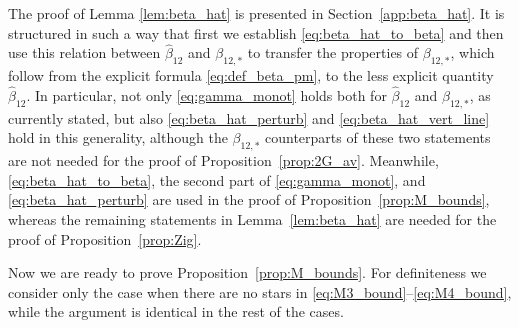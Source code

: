 \documentclass[10pt]{amsart}
\numberwithin{equation}{section}
\begin{document}
The proof of Lemma \ref{lem:beta_hat} is presented in Section~\ref{app:beta_hat}. It is structured in such a way that first we establish \eqref{eq:beta_hat_to_beta} and then use this relation between $\widehat{\beta}_{12}$ and $\beta_{12,*}$ to transfer the properties of $\beta_{12,*}$, which follow from the explicit formula \eqref{eq:def_beta_pm}, to the less explicit quantity $\widehat{\beta}_{12}$. In particular, not only \eqref{eq:gamma_monot} holds both for $\widehat{\beta}_{12}$ and $\beta_{12,*}$, as currently stated, but also \eqref{eq:beta_hat_perturb} and \eqref{eq:beta_hat_vert_line} hold in this generality, although the $\beta_{12,*}$ counterparts of these two statements are not needed for the proof of Proposition~\ref{prop:2G_av}. Meanwhile, \eqref{eq:beta_hat_to_beta}, the second part of \eqref{eq:gamma_monot}, and \eqref{eq:beta_hat_perturb} are used in the proof of Proposition~\ref{prop:M_bounds}, whereas the remaining statements in Lemma~\ref{lem:beta_hat} are needed for the proof of Proposition~\ref{prop:Zig}. 


Now we are ready to prove Proposition~\ref{prop:M_bounds}. For definiteness we consider only the case when there are no stars in \eqref{eq:M3_bound}--\eqref{eq:M4_bound}, while the argument is identical in the rest of the cases.


\medskip
\end{document}
